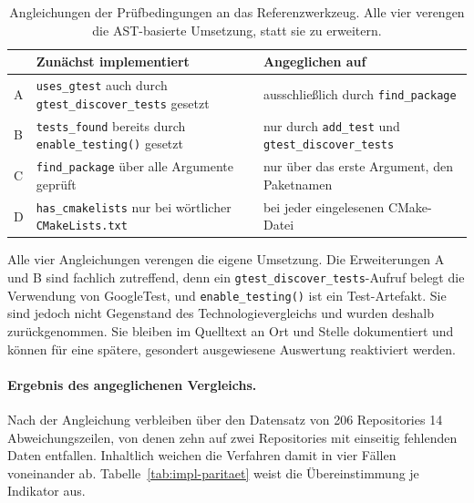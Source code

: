 \documentclass[12pt,a4paper,twoside,headsepline,parskip=half]{scrreprt}
\begin{document}
\begin{table}[H]
    \centering
    \small
    \begin{tabularx}{\textwidth}{l X X}
        \toprule
        & \textbf{Zunächst implementiert} & \textbf{Angeglichen auf} \\
        \midrule
        A & \texttt{uses\_gtest} auch durch \texttt{gtest\_discover\_tests} gesetzt
          & ausschließlich durch \texttt{find\_package} \\
        B & \texttt{tests\_found} bereits durch \texttt{enable\_testing()} gesetzt
          & nur durch \texttt{add\_test} und \texttt{gtest\_discover\_tests} \\
        C & \texttt{find\_package} über alle Argumente geprüft
          & nur über das erste Argument, den Paketnamen \\
        D & \texttt{has\_cmakelists} nur bei wörtlicher \texttt{CMakeLists.txt}
          & bei jeder eingelesenen CMake-Datei \\
        \bottomrule
    \end{tabularx}
    \caption{Angleichungen der Prüfbedingungen an das Referenzwerkzeug. Alle vier
    verengen die AST-basierte Umsetzung, statt sie zu erweitern.}
    \label{tab:impl-angleichung}
\end{table}

Alle vier Angleichungen verengen die eigene Umsetzung. Die Erweiterungen A und B
sind fachlich zutreffend, denn ein
\texttt{gtest\_discover\_tests}-Aufruf belegt die Verwendung von GoogleTest, und
\texttt{enable\_testing()} ist ein Test-Artefakt. Sie sind jedoch nicht Gegenstand des
Technologievergleichs und wurden deshalb zurückgenommen. Sie bleiben im Quelltext an
Ort und Stelle dokumentiert und können für eine spätere, gesondert ausgewiesene
Auswertung reaktiviert werden.

\paragraph{Ergebnis des angeglichenen Vergleichs.}
Nach der Angleichung verbleiben über den Datensatz von 206 Repositories 14
Abweichungszeilen, von denen zehn auf zwei Repositories mit einseitig fehlenden Daten
entfallen. Inhaltlich weichen die Verfahren damit in vier Fällen voneinander ab.
Tabelle~\ref{tab:impl-paritaet} weist die Übereinstimmung je Indikator aus.
\end{document}
